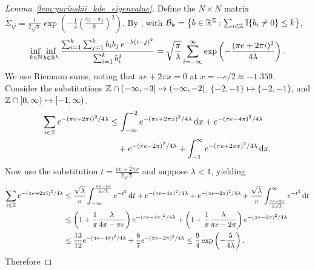 \begin{proof}[Lemma~\ref{lem:yurinskii_kde_eigenvalue}]
  Define the $N \times N$ matrix
  $\tilde\Sigma_{i j} = \frac{1}{2 \sqrt \pi}
  \exp \left( - \frac{1}{4} \left( \frac{x_i-x_j}{h} \right)^2 \right)$.
  By \citet[Proposition~2.4,
  Proposition~2.5, and Equation~2.10]{baxter1994norm},
  with
  $\mathcal{B}_k = \big\{b \in \mathbb{R}^{\mathbb{Z}} :
  \sum_{i \in \mathbb{Z}} \mathbb{I}\{b_i \neq 0\} \leq k \big\}$,
  \begin{align*}
    \inf_{k \in \mathbb{N}}
    \inf_{b \in \mathbb{R}^k}
    \frac{\sum_{i=1}^k \sum_{j=1}^k b_i b_j \, e^{-\lambda(i-j)^2}}
    {\sum_{i=1}^k b_i^2}
    =
    \sqrt{\frac{\pi}{\lambda}}
    \sum_{i=-\infty}^{\infty}
    \exp \left( - \frac{(\pi e + 2 \pi i)^2}{4 \lambda} \right).
  \end{align*}
  We use Riemann sums,
  noting that $\pi e + 2 \pi x = 0$ at
  $x = -e/2 \approx -1.359$.
  Consider the substitutions
  $\mathbb{Z} \cap (-\infty, -3] \mapsto (-\infty, -2]$,
  $\{-2, -1\} \mapsto \{-2, -1\}$, and
  $\mathbb{Z} \cap [0, \infty) \mapsto [-1, \infty)$.
  \begin{align*}
    \sum_{i \in \mathbb{Z}}
    e^{-(\pi e + 2 \pi i)^2 / 4 \lambda}
    &\leq
    \int_{-\infty}^{-2}
    e^{ - (\pi e + 2 \pi x)^2/4 \lambda}
    \,\mathrm{d}x
    + e^{- (\pi e - 4 \pi)^2/4 \lambda} \\
    &\quad+
    e^{ - (\pi e - 2 \pi)^2 / 4 \lambda}
    + \int_{-1}^{\infty}
    e^{ -(\pi e + 2 \pi x)^2 / 4 \lambda}
    \,\mathrm{d}x.
  \end{align*}
  Now use the substitution $t = \frac{\pi e + 2 \pi x}{2 \sqrt \lambda}$
  and suppose $\lambda < 1$, yielding
  \begin{align*}
    \sum_{i \in \mathbb{Z}}
    e^{-(\pi e + 2 \pi i)^2 / 4 \lambda}
    &\leq
    \frac{\sqrt \lambda}{\pi}
    \int_{-\infty}^{\frac{\pi e - 4 \pi}{2 \sqrt \lambda}}
    e^{-t^2}
    \,\mathrm{d}t
    + e^{- (\pi e - 4 \pi)^2/4 \lambda}
    + e^{ - (\pi e - 2 \pi)^2 / 4 \lambda}
    + \frac{\sqrt \lambda}{\pi}
    \int_{\frac{\pi e - 2 \pi}{2 \sqrt \lambda}}^{\infty}
    e^{-t^2}
    \,\mathrm{d}t \\
    &\leq
    \left( 1 + \frac{1}{\pi} \frac{\lambda}{4 \pi - \pi e} \right)
    e^{-(\pi e - 4 \pi)^2 / 4 \lambda}
    +
    \left( 1 + \frac{1}{\pi} \frac{\lambda}{\pi e - 2 \pi} \right)
    e^{- (\pi e - 2 \pi)^2 / 4 \lambda} \\
    &\leq
    \frac{13}{12}
    e^{-(\pi e - 4 \pi)^2 / 4 \lambda}
    +
    \frac{8}{7}
    e^{- (\pi e - 2 \pi)^2 / 4 \lambda}
    \leq
    \frac{9}{4}
    \exp \left( - \frac{5}{4 \lambda} \right).
  \end{align*}
  Therefore

\end{proof}
